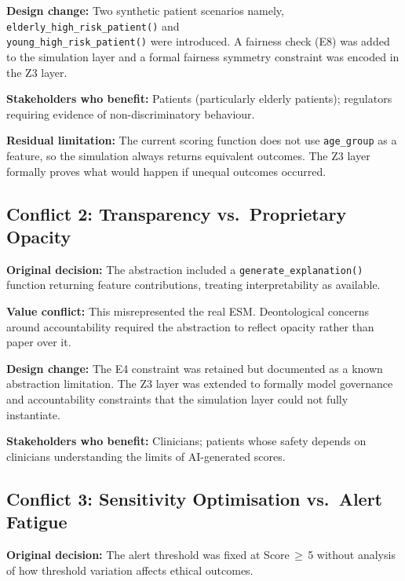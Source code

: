 \documentclass[]{UCD_CS_41820_Report}
\begin{document}
\textbf{Design change:} Two synthetic patient scenarios namely, \texttt{elderly\_high\_risk\_patient()}
and \\ \texttt{young\_high\_risk\_patient()} were introduced. A fairness check (E8)
was added to the simulation layer and a formal fairness symmetry constraint was
encoded in the Z3 layer.\par
\medskip

\textbf{Stakeholders who benefit:} Patients (particularly elderly patients);
regulators requiring evidence of non-discriminatory behaviour.\par
\medskip

\textbf{Residual limitation:} The current scoring function does not use
\texttt{age\_group} as a feature, so the simulation always returns equivalent
outcomes. The Z3 layer formally proves what would happen if unequal outcomes
occurred.

\subsection*{Conflict 2: Transparency vs.\ Proprietary Opacity}

\textbf{Original decision:} The abstraction included a \texttt{generate\_explanation()}
function returning feature contributions, treating interpretability as available.\par
\medskip

\textbf{Value conflict:} This misrepresented the real ESM. Deontological concerns
around accountability required the abstraction to reflect opacity rather than paper
over it.\par
\medskip

\textbf{Design change:} The E4 constraint was retained but documented as a known
abstraction limitation. The Z3 layer was extended to formally model governance and
accountability constraints that the simulation layer could not fully instantiate.\par
\medskip

\textbf{Stakeholders who benefit:} Clinicians; patients whose safety depends on
clinicians understanding the limits of AI-generated scores.

\subsection*{Conflict 3: Sensitivity Optimisation vs.\ Alert Fatigue}

\textbf{Original decision:} The alert threshold was fixed at Score\,$\geq$\,5
without analysis of how threshold variation affects ethical outcomes.\par
\medskip
\end{document}
